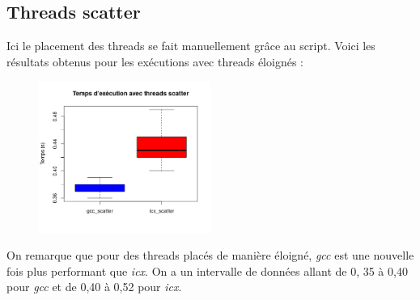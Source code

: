 \documentclass{rapport}
\begin{document}
        \subsection{Threads scatter}
        Ici le placement des threads se fait manuellement grâce au script.
        \newline
        Voici les résultats obtenus pour les exécutions avec threads éloignés :

        \begin{figure}[H]
            \centering
            \includegraphics[width=0.5\textwidth]{../benhmark/scatter.png}
        \end{figure}

        On remarque que pour des threads placés de manière éloigné, \textit{gcc} est une nouvelle fois plus performant que \textit{icx}. On a un intervalle de données allant de 0, 35 à 0,40 pour \textit{gcc} et de 0,40 à 0,52 pour \textit{icx}.
    \clearpage
\end{document}
